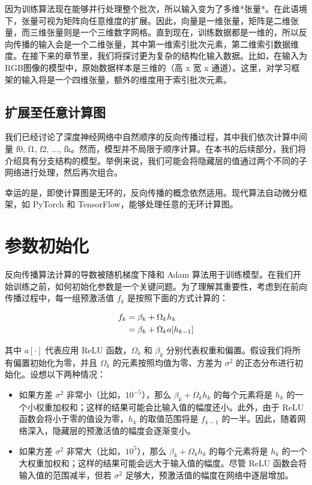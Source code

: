 \documentclass[lang=cn,newtx,10pt,scheme=chinese]{elegantbook}
\begin{document}
因为训练算法现在能够并行处理整个批次，所以输入变为了多维*张量*。在此语境下，张量可视为矩阵向任意维度的扩展。因此，向量是一维张量，矩阵是二维张量，而三维张量则是一个三维数字网格。直到现在，训练数据都是一维的，所以反向传播的输入会是一个二维张量，其中第一维索引批次元素，第二维索引数据维度。在接下来的章节里，我们将探讨更为复杂的结构化输入数据。比如，在输入为RGB图像的模型中，原始数据样本是三维的（高 x 宽 x 通道）。这里，对学习框架的输入将是一个四维张量，额外的维度用于索引批次元素。
\subsection{扩展至任意计算图}
我们已经讨论了深度神经网络中自然顺序的反向传播过程，其中我们依次计算中间量 f0, f1, f2, ..., fk。然而，模型并不局限于顺序计算。在本书的后续部分，我们将介绍具有分支结构的模型。举例来说，我们可能会将隐藏层的值通过两个不同的子网络进行处理，然后再次组合。

幸运的是，即使计算图是无环的，反向传播的概念依然适用。现代算法自动微分框架，如 PyTorch 和 TensorFlow，能够处理任意的无环计算图。
\section{参数初始化 }
反向传播算法计算的导数被随机梯度下降和 Adam 算法用于训练模型。在我们开始训练之前，如何初始化参数是一个关键问题。为了理解其重要性，考虑到在前向传播过程中，每一组预激活值 \(f_k\) 是按照下面的方式计算的：


\begin{align}
f_k &= \beta_k + \Omega_k h_k \notag \\
&= \beta_k + \Omega_k a[h_{k-1}] 
\end{align}


其中 \(a[\cdot]\) 代表应用 ReLU 函数，\(\Omega_k\) 和 \(\beta_k\) 分别代表权重和偏置。假设我们将所有偏置初始化为零，并且 \(\Omega_k\) 的元素按照均值为零、方差为 \(\sigma^2\) 的正态分布进行初始化。设想以下两种情况：
\begin{itemize}
    \item 如果方差 \(\sigma^2\) 非常小（比如，\(10^{-5}\)），那么 \(\beta_k + \Omega_k h_k\) 的每个元素将是 \(h_k\) 的一个小权重加权和；这样的结果可能会比输入值的幅度还小。此外，由于 ReLU 函数会将小于零的值设为零，\(h_k\) 的取值范围将是 \(f_{k-1}\) 的一半。因此，随着网络深入，隐藏层的预激活值的幅度会逐渐变小。
    \item 如果方差 \(\sigma^2\) 非常大（比如，\(10^5\)），那么 \(\beta_k + \Omega_k h_k\) 的每个元素将是 \(h_k\) 的一个大权重加权和；这样的结果可能会远大于输入值的幅度。尽管 ReLU 函数会将输入值的范围减半，但若 \(\sigma^2\) 足够大，预激活值的幅度在网络中逐层增加。
\end{itemize}
\end{document}
